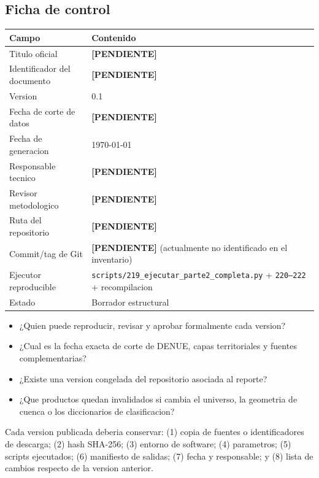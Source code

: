 \documentclass[11pt,letterpaper]{article}
\newcommand{\pendiente}{\textcolor{AtoyacRed}{\textbf{[PENDIENTE]}}}
\newcommand{\ruta}[1]{\texttt{#1}}
\begin{document}
\subsection{Ficha de control}
\begin{longtable}{p{}p{}}
\toprule
\textbf{Campo} & \textbf{Contenido} \\
\midrule
Titulo oficial & \pendiente \\
Identificador del documento & \pendiente \\
Version & 0.1 \\
Fecha de corte de datos & \pendiente \\
Fecha de generacion & \today \\
Responsable tecnico & \pendiente \\
Revisor metodologico & \pendiente \\
Ruta del repositorio & \pendiente \\
Commit/tag de Git & \pendiente\; (actualmente no identificado en el inventario) \\
Ejecutor reproducible & \ruta{scripts/219\_ejecutar\_parte2\_completa.py} + \ruta{220--222} + recompilacion \\
Estado & Borrador estructural \\
\bottomrule
\end{longtable}

\begin{preguntas}
\begin{itemize}
    \item ¿Quien puede reproducir, revisar y aprobar formalmente cada version?
    \item ¿Cual es la fecha exacta de corte de DENUE, capas territoriales y fuentes complementarias?
    \item ¿Existe una version congelada del repositorio asociada al reporte?
    \item ¿Que productos quedan invalidados si cambia el universo, la geometria de cuenca o los diccionarios de clasificacion?
\end{itemize}
\end{preguntas}

\begin{trazabilidad}
Cada version publicada deberia conservar: (1) copia de fuentes o identificadores de descarga; (2) hash SHA-256; (3) entorno de software; (4) parametros; (5) scripts ejecutados; (6) manifiesto de salidas; (7) fecha y responsable; y (8) lista de cambios respecto de la version anterior.
\end{trazabilidad}
\end{document}
